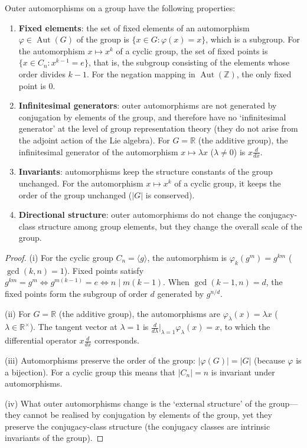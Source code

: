 \begin{proposition}\label{prop:scaling_operator}
Outer automorphisms on a group have the following properties:
\begin{enumerate}[label=(\roman*)]
    \item \textbf{Fixed elements}: the set of fixed elements of an automorphism $\varphi \in \operatorname{Aut}(G)$ of the group is $\{x \in G : \varphi(x) = x\}$, which is a subgroup. For the automorphism $x \mapsto x^k$ of a cyclic group, the set of fixed points is $\{x \in C_n : x^{k-1} = e\}$, that is, the subgroup consisting of the elements whose order divides $k-1$. For the negation mapping in $\operatorname{Aut}(\mathbb{Z})$, the only fixed point is $0$.
    \item \textbf{Infinitesimal generators}: outer automorphisms are not generated by conjugation by elements of the group, and therefore have no `infinitesimal generator' at the level of group representation theory (they do not arise from the adjoint action of the Lie algebra). For $G = \mathbb{R}$ (the additive group), the infinitesimal generator of the automorphism $x \mapsto \lambda x$ ($\lambda \neq 0$) is $x \frac{d}{dx}$.
    \item \textbf{Invariants}: automorphisms keep the structure constants of the group unchanged. For the automorphism $x \mapsto x^k$ of a cyclic group, it keeps the order of the group unchanged ($|G|$ is conserved).
    \item \textbf{Directional structure}: outer automorphisms do not change the conjugacy-class structure among group elements, but they change the overall scale of the group.
\end{enumerate}
\end{proposition}

\begin{proof}
(i) For the cyclic group $C_n = \langle g \rangle$, the automorphism is $\varphi_k(g^m) = g^{km}$ ($\gcd(k,n)=1$). Fixed points satisfy $g^{km} = g^m \iff g^{m(k-1)} = e \iff n \mid m(k-1)$. When $\gcd(k-1,n) = d$, the fixed points form the subgroup of order $d$ generated by $g^{n/d}$.

(ii) For $G = \mathbb{R}$ (the additive group), the automorphisms are $\varphi_\lambda(x) = \lambda x$ ($\lambda \in \mathbb{R}^\times$). The tangent vector at $\lambda = 1$ is $\frac{d}{d\lambda}\big|_{\lambda=1} \varphi_\lambda(x) = x$, to which the differential operator $x \frac{d}{dx}$ corresponds.

(iii) Automorphisms preserve the order of the group: $|\varphi(G)| = |G|$ (because $\varphi$ is a bijection). For a cyclic group this means that $|C_n| = n$ is invariant under automorphisms.

(iv) What outer automorphisms change is the `external structure' of the group---they cannot be realised by conjugation by elements of the group, yet they preserve the conjugacy-class structure (the conjugacy classes are intrinsic invariants of the group).
\end{proof}

